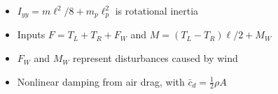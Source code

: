 \documentclass{beamer}
\begin{document}
{\begin{columns}
\end{columns}
\begin{itemize}
	\item $I_{yy} = m\ell^2/8+m_p \ell_p^2$ is rotational inertia
	\item Inputs $F = T_L + T_R + F_W$ and $M = (T_L - T_R)\ell/2 + M_W$
	\item $F_W$ and $M_W$ represent disturbances caused by wind
	\item Nonlinear damping from air drag, with $\bar{c}_d = \frac{1}{2}\rho A$
\end{itemize}
\normalsize
}

\end{document}
